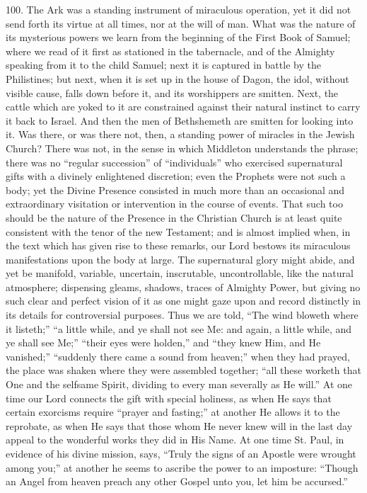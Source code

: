 100.
The Ark was a standing instrument of miraculous operation, yet it did
not send forth its virtue at all times, nor at the will of man. What
was the nature of its mysterious powers we learn from the beginning of
the First Book of Samuel; where we read of it first as stationed in
the tabernacle, and of the Almighty speaking from it to the child
Samuel; next it is captured in battle by the Philistines; but next,
when it is set up in the house of Dagon, the idol, without visible
cause, falls down before it, and its worshippers are smitten. Next,
the cattle which are yoked to it are constrained against their natural
instinct to carry it back to Israel. And then the men of Bethshemeth
are smitten for looking into it. Was there, or was there not, then, a
standing power of miracles in the Jewish Church? There was not, in the
sense in which Middleton understands the phrase; there was no ``regular
succession'' of ``individuals'' who exercised supernatural gifts with a
divinely enlightened discretion; even the Prophets were not such a
body; yet the Divine Presence consisted in much more than an
occasional and extraordinary visitation or intervention in the
course of events. That such too should be the nature of the Presence
in the Christian Church is at least quite consistent with the tenor of
the new Testament; and is almost implied when, in the text which has
given rise to these remarks, our Lord bestows its miraculous
manifestations upon the body at large. The supernatural glory might
abide, and yet be manifold, variable, uncertain, inscrutable,
uncontrollable, like the natural atmosphere; dispensing gleams,
shadows, traces of Almighty Power, but giving no such clear and
perfect vision of it as one might gaze upon and record distinctly in
its details for controversial purposes. Thus we are told, ``The wind
bloweth where it listeth;'' ``a little while, and ye shall not see Me:
and again, a little while, and ye shall see Me;'' ``their eyes were
holden,'' and ``they knew Him, and He vanished;'' ``suddenly there came a
sound from heaven;'' when they had prayed, the place was shaken where
they were assembled together; ``all these worketh that One and the
selfsame Spirit, dividing to every man severally as He will.'' At one
time our Lord connects the gift with special holiness, as when He says
that certain exorcisms require ``prayer and fasting;'' at another He
allows it to the reprobate, as when He says that those whom He never
knew will in the last day appeal to the wonderful works they did in
His Name. At one time St. Paul, in evidence of his divine mission,
says, ``Truly the signs of an Apostle were wrought among you;'' at
another he seems to ascribe the power to an imposture: ``Though an
Angel from heaven preach any other Gospel unto you, let him be
accursed.''


